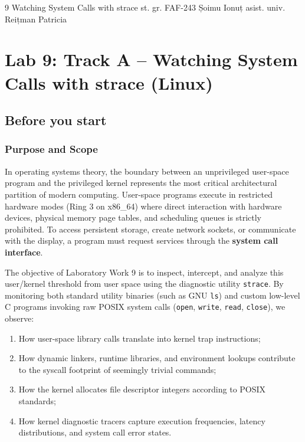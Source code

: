 \documentclass{labreport}
\begin{document}
\labtitle
    {9}
    {Watching System Calls with strace}
    {st. gr. FAF-243}
    {Șoimu Ionuț}
    {asist. univ.\\[0.15cm] Reițman Patricia}

\tableofcontents
\newpage

\section{Lab 9: Track A -- Watching System Calls with strace (Linux)}

\subsection{Before you start}

\subsubsection*{Purpose and Scope}
In operating systems theory, the boundary between an unprivileged user-space program and the privileged kernel represents the most critical architectural partition of modern computing. User-space programs execute in restricted hardware modes (Ring 3 on x86\_64) where direct interaction with hardware devices, physical memory page tables, and scheduling queues is strictly prohibited. To access persistent storage, create network sockets, or communicate with the display, a program must request services through the \textbf{system call interface}.

The objective of Laboratory Work 9 is to inspect, intercept, and analyze this user/kernel threshold from user space using the diagnostic utility \texttt{strace}. By monitoring both standard utility binaries (such as GNU \texttt{ls}) and custom low-level C programs invoking raw POSIX system calls (\texttt{open}, \texttt{write}, \texttt{read}, \texttt{close}), we observe:
\begin{enumerate}[label=(\alph*), noitemsep]
    \item How user-space library calls translate into kernel trap instructions;
    \item How dynamic linkers, runtime libraries, and environment lookups contribute to the syscall footprint of seemingly trivial commands;
    \item How the kernel allocates file descriptor integers according to POSIX standards;
    \item How kernel diagnostic tracers capture execution frequencies, latency distributions, and system call error states.
\end{enumerate}
\end{document}
